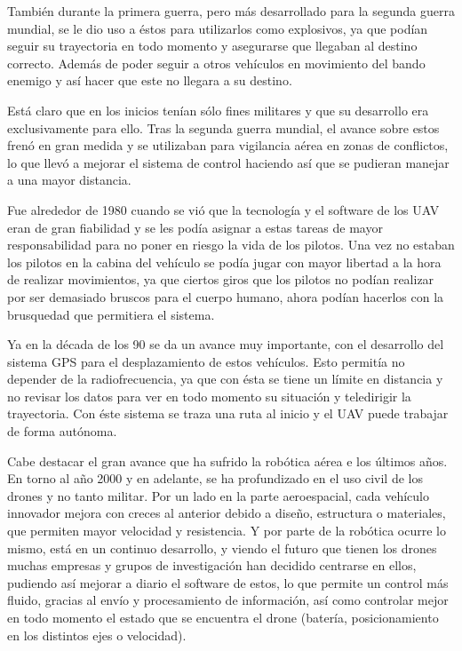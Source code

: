 \hspace{1cm} Tambi\'en durante la primera guerra, pero m\'as desarrollado para la segunda guerra mundial, se le dio uso a \'estos para utilizarlos como explosivos, ya que pod\'ian seguir su trayectoria en todo momento y asegurarse que llegaban al destino correcto. Adem\'as de poder seguir a otros veh\'iculos en movimiento del bando enemigo y as\'i hacer que este no llegara a su destino. 

\hspace{1cm} Est\'a claro que en los inicios ten\'ian s\'olo fines militares y que su desarrollo era exclusivamente para ello. Tras la segunda guerra mundial, el avance sobre estos fren\'o en gran medida y se utilizaban para vigilancia a\'erea en zonas de conflictos, lo que llev\'o a mejorar el sistema de control haciendo as\'i que se pudieran manejar a una mayor distancia. 

\hspace{1 cm}Fue alrededor de 1980 cuando se vi\'o que la tecnolog\'ia y el software de los UAV eran de gran fiabilidad y se les pod\'ia asignar a estas tareas de mayor responsabilidad para no poner en riesgo la vida de los pilotos. Una vez no estaban los pilotos en la cabina del veh\'iculo se pod\'ia jugar con mayor libertad a la hora de realizar movimientos, ya que ciertos giros que los pilotos no pod\'ian realizar por ser demasiado bruscos para el cuerpo humano, ahora pod\'ian hacerlos con la brusquedad que permitiera el sistema.  

\hspace{1 cm} Ya en la d\'ecada de los 90 se da un avance muy importante, con el desarrollo del sistema GPS para el desplazamiento de estos veh\'iculos. Esto permit\'ia no depender de la radiofrecuencia, ya que con \'esta se tiene un l\'imite en distancia y no revisar los datos para ver en todo momento su situaci\'on y teledirigir la trayectoria. Con \'este sistema se traza una ruta al inicio y el UAV puede trabajar de forma aut\'onoma. 

\hspace{1cm} Cabe destacar el gran avance que ha sufrido la rob\'otica a\'erea e los \'ultimos años. En torno al año 2000 y en adelante, se ha profundizado en el uso civil de los drones y no tanto militar. Por un lado en la parte aeroespacial, cada veh\'iculo innovador mejora con creces al anterior debido a diseño, estructura o materiales, que permiten mayor velocidad y resistencia. Y por parte de la rob\'otica ocurre lo mismo, est\'a en un continuo desarrollo, y viendo el futuro que tienen los drones muchas empresas y grupos de investigaci\'on han decidido centrarse en ellos, pudiendo as\'i mejorar a diario el software de estos, lo que permite un control m\'as fluido, gracias al env\'io y procesamiento de informaci\'on, as\'i como controlar mejor en todo momento el estado que se encuentra el drone (bater\'ia, posicionamiento en los distintos ejes o velocidad). 
 


